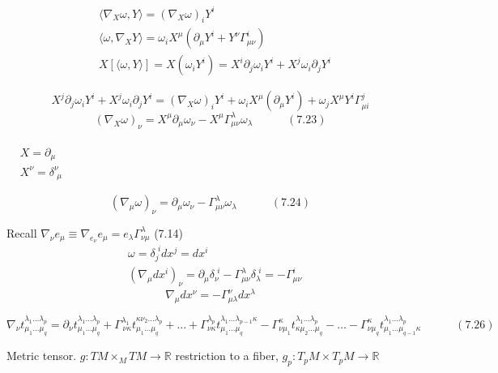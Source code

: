 \documentclass{book}
\begin{document}
\[
\begin{aligned}
  & \langle \nabla_X \omega, Y \rangle = (\nabla_X \omega)_i Y^i \\ 
  & \langle \omega, \nabla_X Y \rangle = \omega_i X^{\mu} ( \partial_{\mu} Y^i + Y^{\nu} \Gamma^i_{\mu \nu } ) \\
  & X[ \langle \omega , Y \rangle ] = X(\omega_i Y^i ) = X^i \partial_j \omega_i Y^i + X^j \omega_i \partial_j Y^i 
\end{aligned}
\]

\[
X^j \partial_j \omega_i Y^i + X^j \omega_i \partial_j Y^i = (\nabla_X \omega)_i Y^i + \omega_i X^{\mu} ( \partial_{\mu} Y^i ) + \omega_j X^{\mu} Y^i \Gamma^j_{ \mu i }
\]
\[
(\nabla_X \omega)_{\nu} = X^{\mu} \partial_{\mu} \omega_{\nu} - X^{\mu} \Gamma^{\lambda}_{ \mu \nu} \omega_{\lambda} \quad \quad \quad (7.23)
\]

$\begin{aligned} & \quad \\ & X = \partial_{\mu} \\ & X^{\nu} = \delta^{\nu}_{ \, \, \mu } \end{aligned}$  

\[
(\nabla_{\mu} \omega)_{\nu} = \partial_{\mu} \omega_{\nu} - \Gamma_{\mu \nu}^{ \lambda}\omega_{\lambda} \quad \quad \quad (7.24)
\]

Recall $\nabla_{\nu} e_{\mu} \equiv \nabla_{e_{\nu}} e_{\mu} = e_{\lambda} \Gamma^{\lambda}_{\nu \mu} $ \quad \quad (7.14)
\[
\begin{aligned}
  & \omega = \delta_j^{ \, \, i } dx^j = dx^i \\ 
  & (\nabla_{\mu} dx^i )_{\nu} = \partial_{\mu} \delta_{\nu}^{ \, \, i } - \Gamma^{\lambda}_{\mu \nu} \delta_{\lambda}^{ \, \, i} = - \Gamma^i_{\mu \nu}
\end{aligned}
\]
\[
\nabla_{\mu} dx^{\nu} = - \Gamma^{\nu}_{\mu \lambda} dx^{\lambda}
\]

\[
\nabla_{\nu} t^{\lambda_1 \dots \lambda_p }_{ \mu_1 \dots \mu_q} = \partial_{\nu} t^{\lambda_1 \dots \lambda_p}_{ \mu_1 \dots \mu_q} + \Gamma^{\lambda_1}_{ \, \nu \kappa } t^{\kappa \nu_2 \dots \lambda_p }_{\mu_1 \dots \mu_q} + \dots + \Gamma^{\lambda_p}_{ \nu \kappa} t^{\lambda_1 \dots \lambda_{p-1} \kappa }_{ \mu_1 \dots \mu_q} - \Gamma^{\kappa}_{ \nu \mu_1} t^{\lambda_1 \dots \lambda_p }_{ \kappa \mu_2 \dots \mu_q} - \dots - \Gamma^{\kappa}_{ \nu \mu_q} t^{\lambda_1 \dots \lambda_p }_{\mu_1 \dots \mu_{q-1} \kappa } \quad \quad \quad (7.26)
\]

Metric tensor.  $g:TM \times_M TM \to \mathbb{R}$ restriction to a fiber, $g_p : T_p M \times T_pM \to \mathbb{R}$
\end{document}
